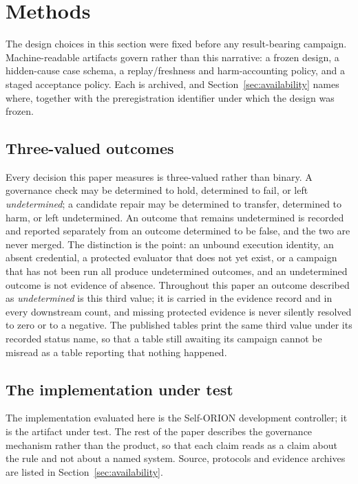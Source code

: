 \section{Methods}
\label{sec:methods}

The design choices in this section were fixed before any result-bearing campaign. Machine-readable artifacts govern rather than this narrative: a frozen design, a hidden-cause case schema, a replay/freshness and harm-accounting policy, and a staged acceptance policy. Each is archived, and Section~\ref{sec:availability} names where, together with the preregistration identifier under which the design was frozen.

\subsection{Three-valued outcomes}

Every decision this paper measures is three-valued rather than binary. A governance check may be determined to hold, determined to fail, or left \emph{undetermined}; a candidate repair may be determined to transfer, determined to harm, or left undetermined. An outcome that remains undetermined is recorded and reported separately from an outcome determined to be false, and the two are never merged. The distinction is the point: an unbound execution identity, an absent credential, a protected evaluator that does not yet exist, or a campaign that has not been run all produce undetermined outcomes, and an undetermined outcome is not evidence of absence. Throughout this paper an outcome described as \emph{undetermined} is this third value; it is carried in the evidence record and in every downstream count, and missing protected evidence is never silently resolved to zero or to a negative. The published tables print the same third value under its recorded status name, so that a table still awaiting its campaign cannot be misread as a table reporting that nothing happened.

\subsection{The implementation under test}

The implementation evaluated here is the Self-ORION development controller; it is the artifact under test. The rest of the paper describes the governance mechanism rather than the product, so that each claim reads as a claim about the rule and not about a named system. Source, protocols and evidence archives are listed in Section~\ref{sec:availability}.

